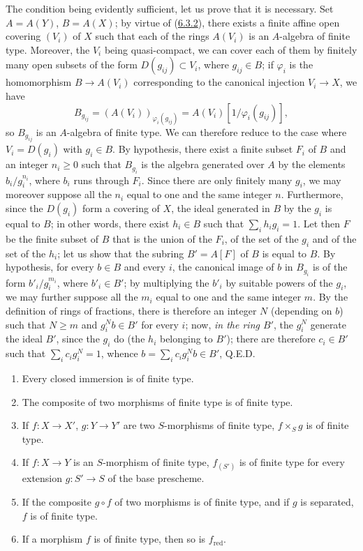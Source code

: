 The condition being evidently sufficient, let us prove that it is necessary.
Set $A=A(Y)$, $B=A(X)$; by virtue of
(\hyperref[I.6.3.2]{6.3.2}), there exists a finite affine open covering
$(V_i)$ of $X$ such that each of the rings $A(V_i)$ is an $A$-algebra of
finite type. Moreover, the $V_i$ being quasi-compact, we can cover each of
them by finitely many open subsets of the form $D(g_{ij})\subset V_i$, where
$g_{ij}\in B$; if $\varphi_i$ is the homomorphism $B\to A(V_i)$ corresponding
to the canonical injection $V_i\to X$, we have
\[
  B_{g_{ij}}=(A(V_i))_{\varphi_i(g_{ij})}
  =A(V_i)[1/\varphi_i(g_{ij})],
\]
so $B_{g_{ij}}$ is an $A$-algebra of finite type. We can therefore reduce
to the case where $V_i=D(g_i)$ with $g_i\in B$. By hypothesis, there exist a
finite subset $F_i$ of $B$ and an integer $n_i\geq 0$ such that $B_{g_i}$ is
the algebra generated over $A$ by the elements $b_i/g_i^{n_i}$, where $b_i$
runs through $F_i$. Since there are only finitely many $g_i$, we may moreover
suppose all the $n_i$ equal to one and the same integer $n$. Furthermore,
since the $D(g_i)$ form a covering of $X$, the ideal generated in $B$ by the
$g_i$ is equal to $B$; in other words, there exist $h_i\in B$ such that
$\sum_i h_i g_i=1$. Let then $F$ be the finite subset of $B$ that is the union
of the $F_i$, of the set of the $g_i$ and of the set of the $h_i$; let us show
that the subring $B'=A[F]$ of $B$ is equal to $B$. By hypothesis, for every
$b\in B$ and every $i$, the canonical image of $b$ in $B_{g_i}$ is of the form
$b'_i/g_i^{m_i}$, where $b'_i\in B'$; by multiplying the $b'_i$ by suitable
powers of the $g_i$, we may further suppose all the $m_i$ equal to one and
the same integer $m$. By the definition of rings of fractions, there is
therefore an integer $N$ (depending on $b$) such that $N\geq m$ and
$g_i^N b\in B'$ for every $i$; now, \emph{in the ring $B'$}, the $g_i^N$
generate the ideal $B'$, since the $g_i$ do (the $h_i$ belonging to $B'$);
there are therefore $c_i\in B'$ such that $\sum_i c_i g_i^N=1$, whence
$b=\sum_i c_i g_i^N b\in B'$, Q.E.D.

\begin{proposition}[6.3.4]
\label{I.6.3.4}
\begin{enumerate}
  \item[(i)] Every closed immersion is of finite type.
  \item[(ii)] The composite of two morphisms of finite type is of finite
    type.
  \item[(iii)] If $f:X\to X'$, $g:Y\to Y'$ are two $S$-morphisms of finite
    type, $f\times_S g$ is of finite type.
  \item[(iv)] If $f:X\to Y$ is an $S$-morphism of finite type, $f_{(S')}$ is
    of finite type for every extension $g:S'\to S$ of the base prescheme.
  \item[(v)] If the composite $g\circ f$ of two morphisms is of finite type,
    and if $g$ is separated, $f$ is of finite type.
  \item[(vi)] If a morphism $f$ is of finite type, then so is
    $f_{\mathrm{red}}$.
\end{enumerate}
\end{proposition}

